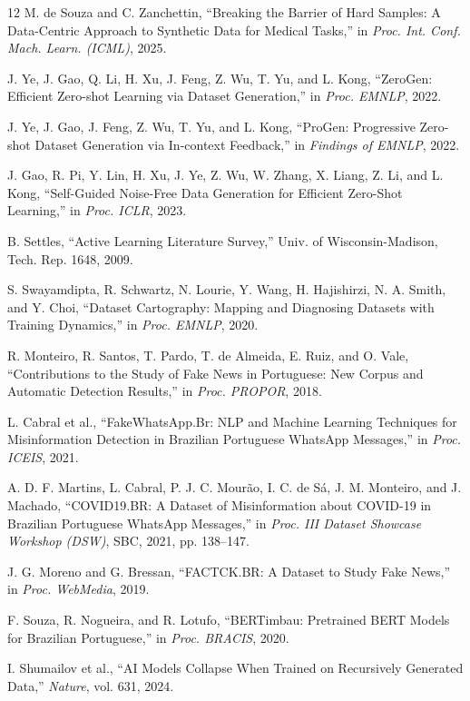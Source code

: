 \documentclass[conference]{IEEEtran}
\begin{document}
\balance

\begin{thebibliography}{12}
M. de Souza and C. Zanchettin, ``Breaking the Barrier of Hard Samples: A Data-Centric Approach to Synthetic Data for Medical Tasks,'' in \emph{Proc. Int. Conf. Mach. Learn. (ICML)}, 2025.

J. Ye, J. Gao, Q. Li, H. Xu, J. Feng, Z. Wu, T. Yu, and L. Kong, ``ZeroGen: Efficient Zero-shot Learning via Dataset Generation,'' in \emph{Proc. EMNLP}, 2022.

J. Ye, J. Gao, J. Feng, Z. Wu, T. Yu, and L. Kong, ``ProGen: Progressive Zero-shot Dataset Generation via In-context Feedback,'' in \emph{Findings of EMNLP}, 2022.

J. Gao, R. Pi, Y. Lin, H. Xu, J. Ye, Z. Wu, W. Zhang, X. Liang, Z. Li, and L. Kong, ``Self-Guided Noise-Free Data Generation for Efficient Zero-Shot Learning,'' in \emph{Proc. ICLR}, 2023.

B. Settles, ``Active Learning Literature Survey,'' Univ. of Wisconsin-Madison, Tech. Rep. 1648, 2009.

S. Swayamdipta, R. Schwartz, N. Lourie, Y. Wang, H. Hajishirzi, N. A. Smith, and Y. Choi, ``Dataset Cartography: Mapping and Diagnosing Datasets with Training Dynamics,'' in \emph{Proc. EMNLP}, 2020.

R. Monteiro, R. Santos, T. Pardo, T. de Almeida, E. Ruiz, and O. Vale, ``Contributions to the Study of Fake News in Portuguese: New Corpus and Automatic Detection Results,'' in \emph{Proc. PROPOR}, 2018.

L. Cabral et al., ``FakeWhatsApp.Br: NLP and Machine Learning Techniques for Misinformation Detection in Brazilian Portuguese WhatsApp Messages,'' in \emph{Proc. ICEIS}, 2021.

A. D. F. Martins, L. Cabral, P. J. C. Mour\~ao, I. C. de S\'a, J. M. Monteiro, and J. Machado, ``COVID19.BR: A Dataset of Misinformation about COVID-19 in Brazilian Portuguese WhatsApp Messages,'' in \emph{Proc. III Dataset Showcase Workshop (DSW)}, SBC, 2021, pp. 138--147.

J. G. Moreno and G. Bressan, ``FACTCK.BR: A Dataset to Study Fake News,'' in \emph{Proc. WebMedia}, 2019.

F. Souza, R. Nogueira, and R. Lotufo, ``BERTimbau: Pretrained BERT Models for Brazilian Portuguese,'' in \emph{Proc. BRACIS}, 2020.

I. Shumailov et al., ``AI Models Collapse When Trained on Recursively Generated Data,'' \emph{Nature}, vol. 631, 2024.
\end{thebibliography}
\end{document}
